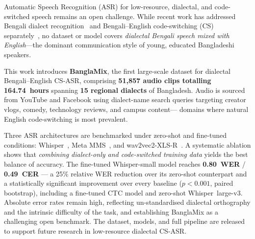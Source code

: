Automatic Speech Recognition (ASR) for low-resource, dialectal, and
code-switched speech remains an open challenge. While recent work has
addressed Bengali dialect recognition~\citep{ben10_2025} and Bengali--English
code-switching (CS) separately~\citep{mucs2021}, no dataset or model covers
\emph{dialectal Bengali speech mixed with English}---the dominant communication
style of young, educated Bangladeshi speakers.

This work introduces \textbf{BanglaMix}, the first large-scale dataset for
dialectal Bengali--English CS-ASR, comprising \textbf{51,857 audio clips
totalling 164.74~hours} spanning \textbf{15 regional dialects} of Bangladesh.
Audio is sourced from YouTube and Facebook using dialect-name search queries
targeting creator vlogs, comedy, technology reviews, and campus content---
domains where natural English code-switching is most prevalent.

Three ASR architectures are benchmarked under zero-shot and fine-tuned
conditions: Whisper~\citep{radford2023whisper}, Meta MMS~\citep{pratap2024mms},
and wav2vec2-XLS-R~\citep{babu2022xlsr}.
A systematic ablation shows that \emph{combining dialect-only and
code-switched training data} yields the best balance of accuracy.
The fine-tuned Whisper-small model reaches \textbf{0.80~WER} / \textbf{0.49~CER}
--- a 25\% relative WER reduction over its zero-shot counterpart and a
statistically significant improvement over every baseline ($p<0.001$, paired
bootstrap), including a fine-tuned CTC model and zero-shot Whisper~large-v3.
Absolute error rates remain high, reflecting un-standardised dialectal
orthography and the intrinsic difficulty of the task, and establishing
BanglaMix as a challenging open benchmark.
The dataset, models, and full pipeline are released to support future research
in low-resource dialectal CS-ASR.
